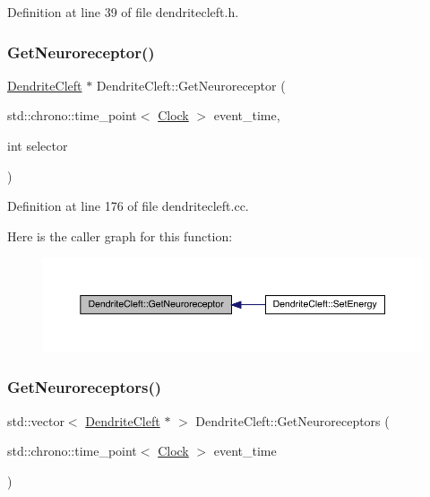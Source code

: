 Definition at line 39 of file dendritecleft.\+h.

\mbox{\label{class_dendrite_cleft_a5eb3a8f143f63b852b8f5e245d385519}} 
\subsubsection{\texorpdfstring{Get\+Neuroreceptor()}{GetNeuroreceptor()}}
{\footnotesize\ttfamily \hyperlink{class_dendrite_cleft}{Dendrite\+Cleft} $\ast$ Dendrite\+Cleft\+::\+Get\+Neuroreceptor (\begin{DoxyParamCaption}\item[{std\+::chrono\+::time\+\_\+point$<$ \hyperlink{universe_8h_a0ef8d951d1ca5ab3cfaf7ab4c7a6fd80}{Clock} $>$}]{event\+\_\+time,  }\item[{int}]{selector }\end{DoxyParamCaption})}



Definition at line 176 of file dendritecleft.\+cc.

Here is the caller graph for this function\+:\nopagebreak
\begin{figure}[H]
\begin{center}
\leavevmode
\includegraphics[width=350pt]{class_dendrite_cleft_a5eb3a8f143f63b852b8f5e245d385519_icgraph}
\end{center}
\end{figure}
\mbox{\label{class_dendrite_cleft_a4a14361574777fb1d66fd4ed2d4f2492}} 
\subsubsection{\texorpdfstring{Get\+Neuroreceptors()}{GetNeuroreceptors()}}
{\footnotesize\ttfamily std\+::vector$<$ \hyperlink{class_dendrite_cleft}{Dendrite\+Cleft} $\ast$ $>$ Dendrite\+Cleft\+::\+Get\+Neuroreceptors (\begin{DoxyParamCaption}\item[{std\+::chrono\+::time\+\_\+point$<$ \hyperlink{universe_8h_a0ef8d951d1ca5ab3cfaf7ab4c7a6fd80}{Clock} $>$}]{event\+\_\+time }\end{DoxyParamCaption})}



